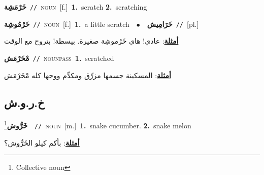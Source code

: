 \documentclass[10pt,a4paper,twoside]{article} %
\begin{document}
\begin{multicols}{2}
{\setlength\topsep{0pt}\textbf{\foreignlanguage{arabic}{خَرْمَشِة}}\ {\color{gray}\texttt{//}\color{black}}\ \textsc{noun}\ [f.]\ \textbf{1.}~scratch  \textbf{2.}~scratching\ } \vspace{2mm}

{\setlength\topsep{0pt}\textbf{\foreignlanguage{arabic}{خَرْمُوشِة}}\ {\color{gray}\texttt{//}\color{black}}\ \textsc{noun}\ [f.]\ \textbf{1.}~a little scratch\ \ $\bullet$\ \ \setlength\topsep{0pt}\textbf{\foreignlanguage{arabic}{خَرَامِيش}}\ {\color{gray}\texttt{//}\color{black}}\ [pl.]\  \begin{flushright}\color{gray}\foreignlanguage{arabic}{\textbf{\underline{\foreignlanguage{arabic}{أمثلة}}}: عادي! هاي خَرْموشِة صغيرة. بيسطة! بتروح مع الوقت}\end{flushright}\color{black}} \vspace{2mm}

{\setlength\topsep{0pt}\textbf{\foreignlanguage{arabic}{مْخَرْمَش}}\ {\color{gray}\texttt{//}\color{black}}\ \textsc{noun\textunderscore pass}\ \textbf{1.}~scratched\  \begin{flushright}\color{gray}\foreignlanguage{arabic}{\textbf{\underline{\foreignlanguage{arabic}{أمثلة}}}: المسكينة جسمها مزرِّق ومكدِّم ووجها كله مْخَرْمَش}\end{flushright}\color{black}} \vspace{2mm}

\vspace{-3mm}
\subsection*{\color{blue}\foreignlanguage{arabic}{خ.ر.و.ش}\color{blue}{}} 

{\setlength\topsep{0pt}\textbf{\foreignlanguage{arabic}{خَرُّوش}}\footnote{Collective noun}\ \ {\color{gray}\texttt{//}\color{black}}\ \textsc{noun}\ [m.]\ \textbf{1.}~snake cucumber.  \textbf{2.}~snake melon\  \begin{flushright}\color{gray}\foreignlanguage{arabic}{\textbf{\underline{\foreignlanguage{arabic}{أمثلة}}}: بأكم كيلو الخَرُّوش؟}\end{flushright}\color{black}} \vspace{2mm}


\end{multicols}
\end{document}

